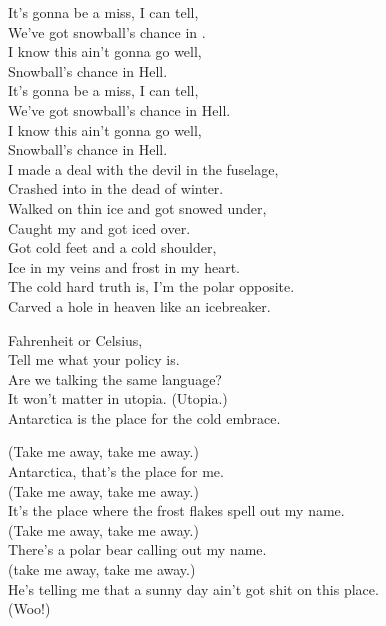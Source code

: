 
It's gonna be a miss, I can tell, \\
We've got snowball's chance in . \\
I know this ain't gonna go well, \\
Snowball's chance in Hell. \\
It's gonna be a miss, I can tell, \\
We've got snowball's chance in Hell. \\
I know this ain't gonna go well, \\
Snowball's chance in Hell. \\

I made a deal with the devil in the fuselage, \\
Crashed into  in the dead of winter. \\
Walked on thin ice and got snowed under, \\
Caught my  and got iced over. \\
Got cold feet and a cold shoulder, \\
Ice in my veins and frost in my heart. \\
The cold hard truth is, I'm the polar opposite. \\
Carved a hole in heaven like an icebreaker. \\


Fahrenheit or Celsius, \\
Tell me what your policy is. \\
Are we talking the same language? \\
It won't matter in utopia. (Utopia.) \\
Antarctica is the place for the cold embrace. \\


(Take me away, take me away.) \\
Antarctica, that's the place for me. \\
(Take me away, take me away.) \\
It's the place where the frost flakes spell out my name. \\
(Take me away, take me away.) \\
There's a polar bear calling out my name. \\
(take me away, take me away.) \\
He's telling me that a sunny day ain't got shit on this place. \\
(Woo!)

